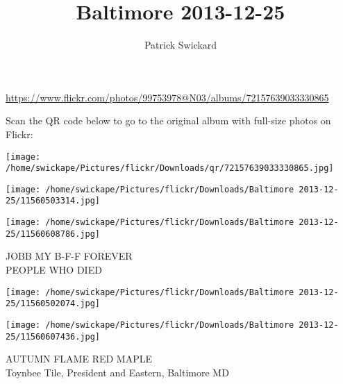 \documentclass[10pt,letterpaper]{article}
\title{Baltimore 2013-12-25}
\author{Patrick Swickard}
\date{}
\begin{document}
\maketitle

\url{https://www.flickr.com/photos/99753978@N03/albums/72157639033330865}

Scan the QR code below to go to the original album with full-size photos on Flickr:

\texttt{[image: /home/swickape/Pictures/flickr/Downloads/qr/72157639033330865.jpg]}
\pagebreak

\texttt{[image: /home/swickape/Pictures/flickr/Downloads/Baltimore 2013-12-25/11560503314.jpg]}

\vspace{0.25in}
\texttt{[image: /home/swickape/Pictures/flickr/Downloads/Baltimore 2013-12-25/11560608786.jpg]}

JOBB MY B{-}F{-}F FOREVER\\
PEOPLE WHO DIED
\pagebreak

\texttt{[image: /home/swickape/Pictures/flickr/Downloads/Baltimore 2013-12-25/11560502074.jpg]}

\vspace{0.25in}
\texttt{[image: /home/swickape/Pictures/flickr/Downloads/Baltimore 2013-12-25/11560607436.jpg]}

AUTUMN FLAME RED MAPLE\\
Toynbee Tile, President and Eastern, Baltimore MD
\pagebreak
\end{document}
